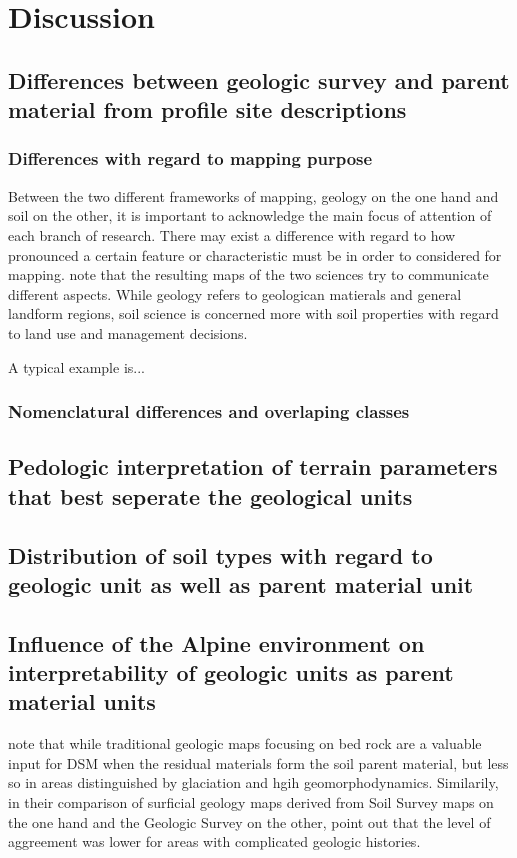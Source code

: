 \documentclass[preprint,12pt,authoryear]{elsarticle}
\begin{document}
\section{Discussion}
\subsection{Differences between geologic survey and parent material from profile site descriptions}

\subsubsection{Differences with regard to mapping purpose}
Between the two different frameworks of mapping, geology on the one hand and soil on the other, it is important to acknowledge the main focus of attention of each branch of research. There may exist a difference with regard to how pronounced a certain feature or characteristic must be in order to considered for mapping. \cite{Miller2015a} note that the resulting maps of the two sciences try to communicate different aspects. While geology refers to geologican matierals and general landform regions, soil science is concerned more with soil properties with regard to land use and management decisions.

A typical example is...


\subsubsection{Nomenclatural differences and overlaping classes}


\subsection{Pedologic interpretation of terrain parameters that best seperate the geological units}

\subsection{Distribution of soil types with regard to geologic unit as well as parent material unit}

\subsection{Influence of the Alpine environment on interpretability of geologic units as parent material units}
\cite{Heung2014} note that while traditional geologic maps focusing on bed rock are a valuable input for DSM when the residual materials form the soil parent material, but less so in areas distinguished by glaciation and hgih geomorphodynamics. Similarily, in their comparison of surficial geology maps derived from Soil Survey maps on the one hand and the Geologic Survey on the other, \cite{Miller2015a} point out that the level of aggreement was lower for areas with complicated geologic histories.
\end{document}
